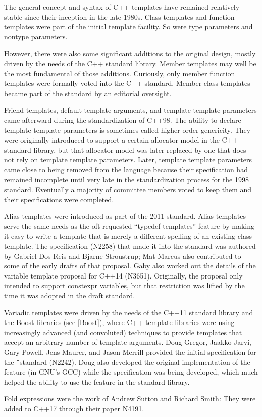 The general concept and syntax of C++ templates have remained relatively stable since their inception in the late 1980s. Class templates and function templates were part of the initial template facility. So were type parameters and nontype parameters.

However, there were also some significant additions to the original design, mostly driven by the needs of the C++ standard library. Member templates may well be the most fundamental of those additions. Curiously, only member function templates were formally voted into the C++ standard. Member class templates became part of the standard by an editorial oversight.

Friend templates, default template arguments, and template template parameters came afterward during the standardization of C++98. The ability to declare template template parameters is sometimes called higher-order genericity. They were originally introduced to support a certain allocator model in the C++ standard library, but that allocator model was later replaced by one that does not rely on template template parameters. Later, template template  parameters came close to being removed from the language because their specification had remained incomplete until very late in the standardization process for the 1998 standard. Eventually a majority of committee members voted to keep them and their specifications were completed.

Alias templates were introduced as part of the 2011 standard. Alias templates serve the same needs as the oft-requested “typedef templates” feature by making it easy to write a template that is merely a different spelling of an existing class template. The specification (N2258) that made it into the standard was authored by Gabriel Dos Reis and Bjarne Stroustrup; Mat Marcus also contributed to some of the early drafts of that proposal. Gaby also worked out the details of the variable template proposal for C++14 (N3651). Originally, the proposal only intended to support constexpr variables, but that restriction was lifted by the time it was adopted in the draft standard.

Variadic templates were driven by the needs of the C++11 standard library and the Boost libraries (see [Boost]), where C++ template libraries were using increasingly advanced (and convoluted) techniques to provide templates that accept an arbitrary number of template arguments. Doug Gregor, Jaakko Jarvi, Gary Powell, Jens Maurer, and Jason Merrill provided the initial specification for the ¨standard (N2242). Doug also developed the original implementation of the feature (in GNU’s GCC) while the specification was being developed, which much helped the ability to use the feature in the standard library.

Fold expressions were the work of Andrew Sutton and Richard Smith: They were added to C++17 through their paper N4191.